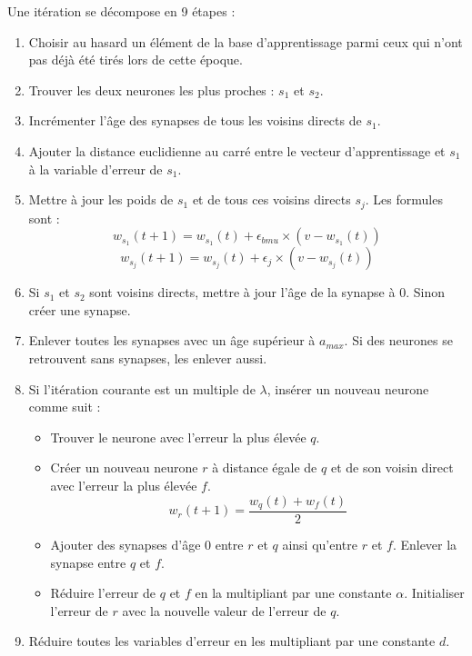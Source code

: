 	Une itération se décompose en 9 étapes :
	\begin{enumerate}
		\item Choisir au hasard un élément de la base d'apprentissage parmi ceux qui n'ont pas déjà été tirés lors de cette époque.
		\item Trouver les deux neurones les plus proches : $s_1$ et $s_2$.
		\item Incrémenter l'âge des synapses de tous les voisins directs de $s_1$.
		\item Ajouter la distance euclidienne au carré entre le vecteur d'apprentissage et $s_1$ à la variable d'erreur de $s_1$.
		\item Mettre à jour les poids de $s_1$ et de tous ces voisins directs $s_j$. Les formules sont :
		\begin{equation}
			w_{s_1}(t+1) = w_{s_1}(t) + \epsilon_{\textit{bmu}} \times (v - w_{s_1}(t))
		\end{equation}
		\begin{equation}
			w_{s_j}(t+1) = w_{s_j}(t) + \epsilon_{j} \times (v - w_{s_j}(t))
		\end{equation}
		\item Si $s_1$ et $s_2$ sont voisins directs, mettre à jour l'âge de la synapse à 0. Sinon créer une synapse.
		\item Enlever toutes les synapses avec un âge supérieur à $a_{\textit{max}}$. Si des neurones se retrouvent sans synapses, les enlever aussi.
		\item Si l'itération courante est un multiple de $\lambda$, insérer un nouveau neurone comme suit :
		\begin{itemize}
			\item Trouver le neurone avec l'erreur la plus élevée $q$.
			\item Créer un nouveau neurone $r$ à distance égale de $q$ et de son voisin direct avec l'erreur la plus élevée $f$.
			\begin{equation}
				w_r(t+1) = \frac{w_q(t) + w_f(t)}{2}  
			\end{equation}
			\item Ajouter des synapses d'âge 0 entre $r$ et $q$ ainsi qu'entre $r$ et $f$. Enlever la synapse entre $q$ et $f$.
			\item Réduire l'erreur de $q$ et $f$ en la multipliant par une constante $\alpha$. Initialiser l'erreur de $r$ avec la nouvelle valeur de l'erreur de $q$.
		\end{itemize}
		\item Réduire toutes les variables d'erreur en les multipliant par une constante $d$.
	\end{enumerate}

